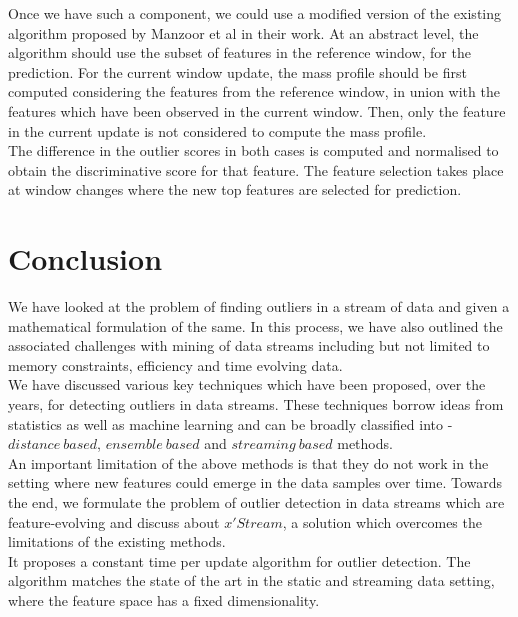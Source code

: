 Once we have such a component, we could use a modified version of the existing algorithm proposed by Manzoor et al in their work\cite{Manzoor:2018:XOD:3219819.3220107}. At an abstract level, the algorithm should use the subset of features in the reference window, for the prediction. For the current window update, the mass profile should be first computed considering the features from the reference window, in union with the features which have been observed in the current window. Then, only the feature in the current update is not considered to compute the mass profile. \\

The difference in the outlier scores in both cases is computed and normalised to obtain the discriminative score for that feature. The feature selection takes place at window changes where the new top features are selected for prediction.

\section{Conclusion}

We have looked at the problem of finding outliers in a stream of data and given a mathematical formulation of the same. In this process, we have also outlined the associated challenges with mining of data streams including but not limited to memory constraints, efficiency and time evolving data. \\

We have discussed various key techniques which have been proposed, over the years, for detecting outliers in data streams. These techniques borrow ideas from statistics as well as machine learning and can be broadly classified into - $distance\ based$, $ensemble\ based$ and $streaming\ based$ methods. \\

An important limitation of the above methods is that they do not work in the setting where new features could emerge in the data samples over time. Towards the end, we formulate the problem of outlier detection in data streams which are feature-evolving and discuss about $x'Stream$, a solution which overcomes the limitations of the existing methods. \\

It proposes a constant time per update algorithm for outlier detection. The algorithm matches the state of the art in the static and streaming data setting, where the feature space has a fixed dimensionality.

